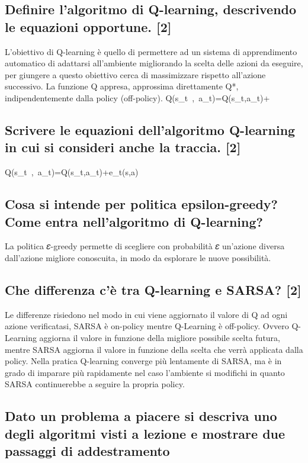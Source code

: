 \documentclass[\main/main.tex]{subfiles}
\begin{document}
\subsection{Definire l'algoritmo di Q-learning, descrivendo le equazioni opportune. [2]}
L'obiettivo di Q-learning è quello di permettere ad un sistema di apprendimento automatico di adattarsi all'ambiente migliorando la scelta delle azioni da eseguire, per giungere a questo obiettivo cerca di massimizzare rispetto all'azione successivo. La funzione Q appresa, approssima direttamente Q*, indipendentemente dalla policy (off-policy).
Q\left(s_t\ ,\ a_t\right)=Q\left(s_t,a_t\right)+

\subsection{Scrivere le equazioni dell'algoritmo Q-learning in cui si consideri anche la traccia. [2]}
Q\left(s_t\ ,\ a_t\right)=Q\left(s_t,a_t\right)+\alpha{}\ast e_t\left(s,a\right)

\subsection{Cosa si intende per politica epsilon-greedy? Come entra nell'algoritmo di Q-learning? }
La politica 𝜀-greedy permette di scegliere con probabilità 𝜀 un'azione diversa dall'azione migliore conoscuita, in modo da esplorare le nuove possibilità.

\subsection{Che differenza c'è tra Q-learning e SARSA? [2]}
Le differenze risiedono nel modo in cui viene aggiornato il valore di Q ad ogni azione verificatasi, SARSA è on-policy mentre Q-Learning è off-policy. Ovvero Q-Learning aggiorna il valore in funzione della migliore possibile scelta futura, mentre SARSA aggiorna il valore in funzione della scelta che verrà applicata dalla policy. Nella pratica Q-learning converge più lentamente di SARSA, ma è in grado di imparare più rapidamente nel caso l'ambiente si modifichi in quanto SARSA continuerebbe a seguire la propria policy.

\subsection{Dato un problema a piacere si descriva uno degli algoritmi visti a lezione e mostrare due passaggi di addestramento}
\end{document}
